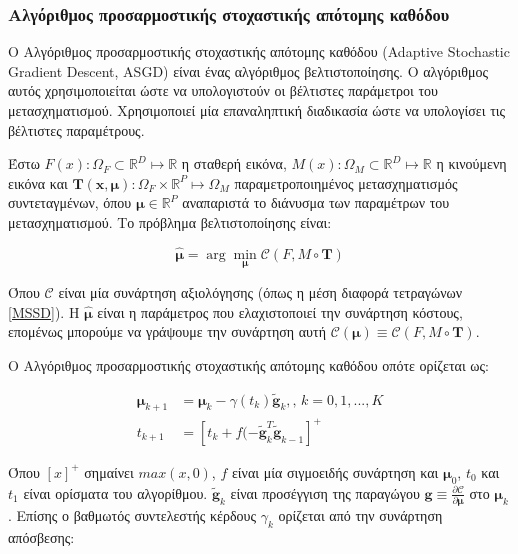 \documentclass[a4paper,12pt]{article}
\newcommand{\argminUnder}{\arg\!\min}
\newcommand{\R}{\mathbb{R}}
\begin{document}
\subsubsection{Αλγόριθμος προσαρμοστικής στοχαστικής απότομης καθόδου}
\label{reg:asgd:1}

Ο Αλγόριθμος προσαρμοστικής στοχαστικής απότομης καθόδου (Adaptive Stochastic
Gradient Descent, ASGD) \cite{ASGD:1} είναι ένας αλγόριθμος βελτιστοποίησης. Ο
αλγόριθμος αυτός χρησιμοποιείται ώστε να υπολογιστούν οι βέλτιστες παράμετροι
του μετασχηματισμού. Χρησιμοποιεί μία επαναληπτική διαδικασία ώστε να υπολογίσει
τις βέλτιστες παραμέτρους.

Έστω $F(x): \Omega_F \subset \R^D \mapsto \R$ η σταθερή εικόνα, $M(x): \Omega_M
\subset \R^D \mapsto \R$ η κινούμενη εικόνα και $\bm{T(x,\mu)}: \Omega_F \times
\R^P \mapsto \Omega_M$ παραμετροποιημένος μετασχηματισμός συντεταγμένων, όπου
$\bm{\mu} \in \R^P$ αναπαριστά το διάνυσμα των παραμέτρων του μετασχηματισμού.
Το πρόβλημα βελτιστοποίησης είναι:


\begin{equation*}
    \hat{\bm{\mu}} = \argminUnder_{\bm{\mu}} \mathcal{C} (F,M\circ \bm{T})
\end{equation*}

Όπου $\mathcal{C}$ είναι μία συνάρτηση αξιολόγησης (όπως η μέση διαφορά
τετραγώνων \ref{MSSD}). Η $\hat{\bm{\mu}}$ είναι η παράμετρος που ελαχιστοποιεί
την συνάρτηση κόστους, επομένως μπορούμε να γράψουμε την συνάρτηση αυτή
$\mathcal{C} (\bm{\mu}) \equiv \mathcal{C} (F,M\circ \bm{T})$.

Ο Αλγόριθμος προσαρμοστικής στοχαστικής απότομης καθόδου οπότε ορίζεται ως:

\begin{equation*}
\begin{split}
    \bm{\mu}_{k+1} &= \bm{\mu}_{k} - \gamma(t_k) \widetilde{\bm{g}}_{k},
    \text{,  }
    k=0,1,...,K
    \\
    t_{k+1} &= [t_k + f(-\widetilde{\bm{g}}_{k}^T \widetilde{\bm{g}}_{k-1}]^+
\end{split}
\end{equation*}

Όπου $[x]^+$ σημαίνει $max(x,0)$, $f$ είναι μία σιγμοειδής συνάρτηση και
$\bm{\mu}_{0}$, $t_0$ και $t_1$ είναι ορίσματα του αλγορίθμου.
$\widetilde{\bm{g}}_{k}$ είναι προσέγγιση της παραγώγου $\bm{g} \equiv \frac
{\partial \mathcal{C}} {\partial \bm{\mu}}$ στο $\bm{\mu}_k$. Επίσης ο βαθμωτός
συντελεστής κέρδους $\gamma_k$ ορίζεται από την συνάρτηση απόσβεσης: 
\end{document}

